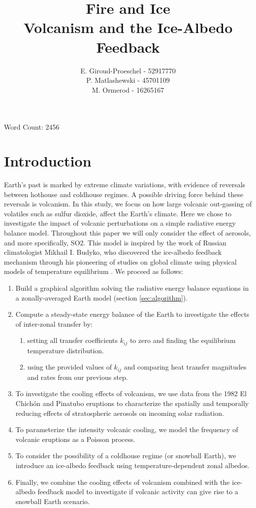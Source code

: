 \documentclass[12pt]{article}
\title{Fire and Ice\\
\large Volcanism and the Ice-Albedo Feedback}
\author{
    E. Giroud-Proeschel - 52917770 \\
    P. Matlashewski - 45701109\\
    M. Ormerod - 16265167
}
\begin{document}
\maketitle
\centerline{Word Count: 2456}
\newpage
\tableofcontents
\newpage

\section{Introduction}
Earth's past is marked by extreme climate variations, with evidence of
reversals between hothouse and coldhouse regimes. A possible driving force behind
these reversals is volcanism. In this study, we focus on
how large volcanic out-gassing of volatiles such as sulfur dioxide,
affect the Earth's climate. Here we chose to investigate
the impact of volcanic perturbations on a simple radiative
energy balance model. Throughout this paper we will only consider the effect of aerosols,
and more specifically, SO2. This model is inspired by the
work of Russian climatologist Mikhail I. Budyko, who discovered the ice-albedo
feedback mechanism through his pioneering of studies
on global climate using physical models of temperature equilibrium \parencite{budyko_albedo}.
We proceed as follows:

\begin{enumerate}
    \item Build a graphical algorithm solving the radiative energy balance equations
    in a zonally-averaged Earth model (section \ref{sec:algorithm}).
    \item Compute a steady-state energy balance of the Earth to investigate
    the effects of inter-zonal transfer by:
    \begin{enumerate}
        \item setting all transfer coefficients $k_{ij}$ to zero and finding the
        equilibrium temperature distribution.
        \item using the provided values of $k_{ij}$ and comparing heat transfer
        magnitudes and rates from our previous step.
    \end{enumerate}
    \item To investigate the cooling effects of volcanism, we use data from
    the 1982 El Chichón and Pinatubo eruptions \parencite{robock}
    to characterize the spatially and temporally reducing effects of stratospheric aerosols
    on incoming solar radiation.
    \item To parameterize the intensity volcanic cooling, we model the frequency
    of volcanic eruptions as a Poisson process.
    \item To consider the possibility of a coldhouse regime (or snowball Earth),
    we introduce an ice-albedo feedback using temperature-dependent zonal albedos.
    \item Finally, we combine the cooling effects of volcanism combined with the
    ice-albedo feedback model to investigate if volcanic activity
    can give rise to a snowball Earth scenario.


\end{enumerate}
\end{document}

